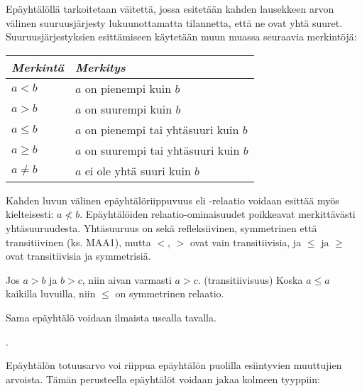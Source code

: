 Epäyhtälöllä tarkoitetaan väitettä, jossa esitetään kahden lausekkeen arvon välinen suuruusjärjesty lukuunottamatta tilannetta, että ne ovat yhtä suuret. Suuruusjärjestyksien esittämiseen käytetään muun muassa seuraavia merkintöjä:

\begin{center}
\begin{tabular}{l|l}
\emph{Merkintä} & \emph{Merkitys} \\
\hline
$a<b$ &  $a$ on pienempi kuin $b$ \\
$a>b$ & $a$ on suurempi kuin $b$ \\
$a \leq b$ & $a$ on pienempi tai yhtäsuuri kuin $b$ \\
$a \geq b$ & $a$ on suurempi tai yhtäsuuri kuin $b$ \\
$a \neq b$ & $a$ ei ole yhtä suuri kuin $b$ \\
\end{tabular}
\end{center}

Kahden luvun välinen epäyhtälöriippuvuus eli -relaatio voidaan esittää myös kielteisesti: $a \nless b $. Epäyhtälöiden relaatio-ominaisuudet poikkeavat merkittävästi yhtäsuuruudesta. Yhtäsuuruus on sekä refleksiivinen, symmetrinen että transitiivinen (ks. MAA1), mutta $<$, $>$ ovat vain transitiivisia, ja $\leq$ ja $\geq$ ovat transitiivisia ja symmetrisiä.

\begin{esimerkki}
Jos $a>b$ ja $b>c$, niin aivan varmasti $a>c$. (transitiivisuus)
Koska $a \leq a$ kaikilla luvuilla, niin $\leq$ on symmetrinen relaatio.
\end{esimerkki}

Sama epäyhtälö voidaan ilmaista usealla tavalla.

\begin{esimerkki}
\begin{alakohdat}
.
\end{alakohdat}
\end{esimerkki}

Epäyhtälön totuusarvo voi riippua epäyhtälön puolilla esiintyvien muuttujien arvoista. Tämän perusteella epäyhtälöt voidaan jakaa kolmeen tyyppiin:


